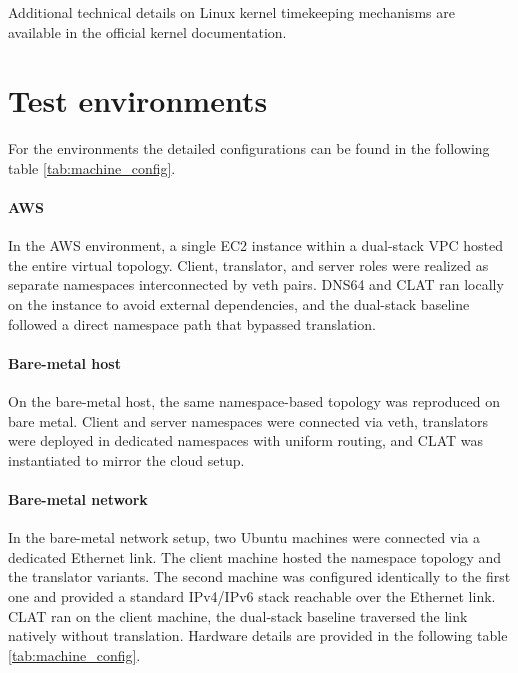 \smallskip

 Additional technical details on Linux kernel timekeeping mechanisms are available in the official kernel documentation\cite{linux_timekeeping_doc}.

\section{Test environments}
For the environments the detailed configurations can be found in the following table \ref{tab:machine_config}.
\paragraph{AWS}
In the AWS environment, a single EC2 instance within a dual-stack VPC hosted the entire virtual topology. Client, translator, and server roles were realized as separate namespaces interconnected by veth pairs\cite{veth4}. DNS64 and CLAT ran locally on the instance to avoid external dependencies, and the dual-stack baseline followed a direct namespace path that bypassed translation.

\paragraph{Bare-metal host}
On the bare-metal host, the same namespace-based topology was reproduced on bare metal. Client and server namespaces were connected via veth, translators were deployed in dedicated namespaces with uniform routing, and CLAT was instantiated to mirror the cloud setup. 
\paragraph{Bare-metal network}
In the bare-metal network setup, two Ubuntu machines were connected via a dedicated Ethernet link. The client machine hosted the namespace topology and the translator variants. The second machine was configured identically to the first one and provided a standard IPv4/IPv6 stack reachable over the Ethernet link. CLAT ran on the client machine, the dual-stack baseline traversed the link natively without translation. Hardware details are provided in the following table \ref{tab:machine_config}.


